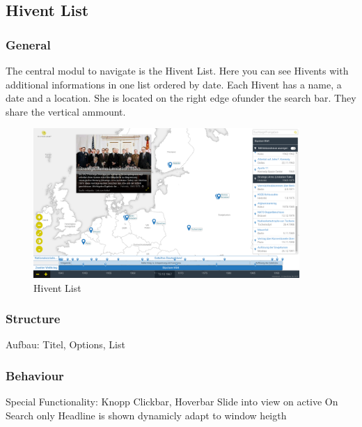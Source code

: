 \subsection{Hivent List} %
\label{sub:hivent_list}

\subsubsection{General} %
\label{ssub:general_hl}
The central modul to navigate \HG is the Hivent List. Here you can see Hivents with additional informations in one list ordered by date. Each Hivent has a name, a date and a location. She is located on the right edge of\HG under the search bar. They share the vertical ammount.

\begin{figure}[H]
  \centering
  \includegraphics[width=0.9\textwidth]{graphics/final_ui.png}
  \caption{Hivent List}
\end{figure}

\subsubsection{Structure} %
\label{ssub:structure_hl}
Aufbau: Titel, Options, List


\subsubsection{Behaviour} %
\label{ssub:behaviour_hl}
Special Functionality: Knopp
Clickbar, Hoverbar
Slide into view on active
On Search only Headline is shown
dynamicly adapt to window heigth

